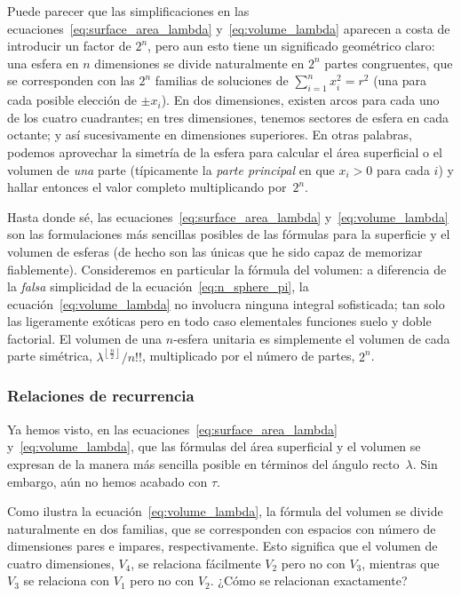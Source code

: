 Puede parecer que las simplificaciones en las ecuaciones~\eqref{eq:surface_area_lambda} y~\eqref{eq:volume_lambda} aparecen a costa de introducir un factor de $2^n$, pero aun esto tiene un significado geométrico claro: una esfera en $n$ dimensiones se divide naturalmente en $2^n$ partes congruentes, que se corresponden con las $2^n$ familias de soluciones de $\sum_{i=1}^{n} x_i^2 = r^2$ (una para cada posible elección de $\pm x_i$). En dos dimensiones, existen arcos para cada uno de los cuatro cuadrantes; en tres dimensiones, tenemos sectores de esfera en cada octante; y así sucesivamente en dimensiones superiores. En otras palabras, podemos aprovechar la simetría de la esfera para calcular el área superficial o el volumen de \emph{una} parte (típicamente la \emph{parte principal} en que $x_i > 0$ para cada $i$) y hallar entonces el valor completo multiplicando por~$2^n$.


Hasta donde sé, las ecuaciones~\eqref{eq:surface_area_lambda} y~\eqref{eq:volume_lambda} son las formulaciones más sencillas posibles de las fórmulas para la superficie y el volumen de esferas (de hecho son las únicas que he sido capaz de memorizar fiablemente). Consideremos en particular la fórmula del volumen: a diferencia de la  \emph{falsa} simplicidad de la ecuación~\eqref{eq:n_sphere_pi}, la ecuación~\eqref{eq:volume_lambda} no involucra ninguna integral sofisticada; tan solo las ligeramente exóticas pero en todo caso elementales funciones suelo y doble factorial. El volumen de una $n$-esfera unitaria es simplemente el volumen de cada parte simétrica, $\lambda^{\left\lfloor \frac{n}{2} \right\rfloor}/n!!$, multiplicado por el número de partes, $2^n$.



\subsubsection{Relaciones de recurrencia} %
\label{sec:recurrences}

Ya hemos visto, en las ecuaciones~\eqref{eq:surface_area_lambda} y~\eqref{eq:volume_lambda}, que las fórmulas del área superficial y el volumen se expresan de la manera más sencilla posible en términos del ángulo recto~$\lambda$. Sin embargo, aún no hemos acabado con $\tau$.

Como ilustra la ecuación~\eqref{eq:volume_lambda}, la fórmula del volumen se divide naturalmente en dos familias, que se corresponden con espacios con número de dimensiones pares e impares, respectivamente. Esto significa que el volumen de cuatro dimensiones, $V_4$, se relaciona fácilmente $V_2$ pero no con $V_3$, mientras que $V_3$ se relaciona con $V_1$ pero no con $V_2$. ¿Cómo se relacionan exactamente?

